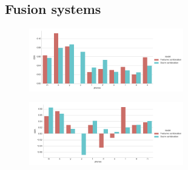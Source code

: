 \subsection{Fusion systems}

\begin{figure}[H]
	\centering
	\includegraphics[width=0.6\textwidth]{files/figures/results/relatives/relatives-fusion-systems-dev-kappa.png}
\end{figure}

\begin{figure}[H]
	\centering
	\includegraphics[width=0.6\textwidth]{files/figures/results/relatives/relative-fusion-systems-heldout-kappa.png}
\end{figure}
